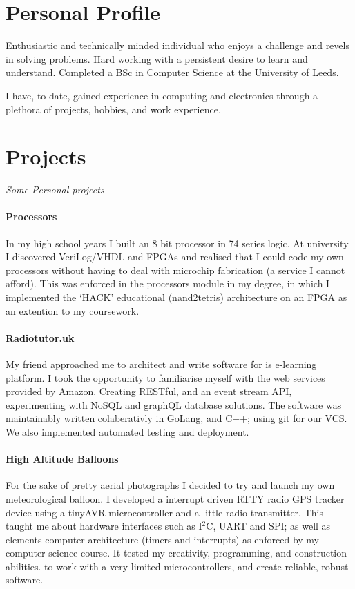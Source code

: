 \documentclass[9pt,a4paper]{article}
\begin{document}
\begin{multicols*}{3}
\section*{Personal Profile}
\vspace{-.3cm}
Enthusiastic and technically minded individual who enjoys a challenge and revels in solving problems.
Hard working with a persistent desire to learn and understand.
Completed a BSc in Computer Science at the University of Leeds.

I have, to date, gained experience in computing and electronics through a plethora of projects, hobbies, and work experience.

\section*{Projects}
\vspace*{-.3cm}
\textit{Some Personal projects}
\vspace*{-.3cm}

\paragraph{Processors} In my high school years I built an 8 bit processor in 74 series logic.
At university I discovered VeriLog/VHDL and FPGAs and realised that I could code my own processors without having to deal with microchip fabrication (a service I cannot afford).
This was enforced in the processors module in my degree, in which I implemented the `HACK' educational (nand2tetris) architecture on an FPGA as an extention to my coursework.

\paragraph{Radiotutor.uk} My friend approached me to architect and write software for is e-learning platform.
I took the opportunity to familiarise myself with the web services provided by Amazon.
Creating RESTful, and an event stream API, experimenting with NoSQL and graphQL database solutions.
The software was maintainably written colaberativly in GoLang, and C++; using git for our VCS.
We also implemented automated testing and deployment.

\paragraph{High Altitude Balloons} For the sake of pretty aerial photographs I decided to try and launch my own meteorological balloon.
I developed a interrupt driven RTTY radio GPS tracker device using a tinyAVR microcontroller and a little radio transmitter.
This taught me about hardware interfaces such as I$^2$C, UART and SPI;
as well as elements computer architecture (timers and interrupts) as enforced by my computer science course.
It tested my creativity, programming, and construction abilities. to work with a very limited microcontrollers, and create reliable, robust software.


\end{multicols*}
\end{document}
